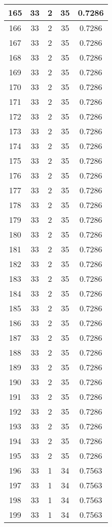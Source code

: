 \documentclass[letterpaper, 12pt]{article}
\begin{document}
\begin{longtable}{|c|c|c|c|c|}
\hline
165 & 33 & 2 & 35 & 0.7286 \\
\hline
166 & 33 & 2 & 35 & 0.7286 \\
\hline
167 & 33 & 2 & 35 & 0.7286 \\
\hline
168 & 33 & 2 & 35 & 0.7286 \\
\hline
169 & 33 & 2 & 35 & 0.7286 \\
\hline
170 & 33 & 2 & 35 & 0.7286 \\
\hline
171 & 33 & 2 & 35 & 0.7286 \\
\hline
172 & 33 & 2 & 35 & 0.7286 \\
\hline
173 & 33 & 2 & 35 & 0.7286 \\
\hline
174 & 33 & 2 & 35 & 0.7286 \\
\hline
175 & 33 & 2 & 35 & 0.7286 \\
\hline
176 & 33 & 2 & 35 & 0.7286 \\
\hline
177 & 33 & 2 & 35 & 0.7286 \\
\hline
178 & 33 & 2 & 35 & 0.7286 \\
\hline
179 & 33 & 2 & 35 & 0.7286 \\
\hline
180 & 33 & 2 & 35 & 0.7286 \\
\hline
181 & 33 & 2 & 35 & 0.7286 \\
\hline
182 & 33 & 2 & 35 & 0.7286 \\
\hline
183 & 33 & 2 & 35 & 0.7286 \\
\hline
184 & 33 & 2 & 35 & 0.7286 \\
\hline
185 & 33 & 2 & 35 & 0.7286 \\
\hline
186 & 33 & 2 & 35 & 0.7286 \\
\hline
187 & 33 & 2 & 35 & 0.7286 \\
\hline
188 & 33 & 2 & 35 & 0.7286 \\
\hline
189 & 33 & 2 & 35 & 0.7286 \\
\hline
190 & 33 & 2 & 35 & 0.7286 \\
\hline
191 & 33 & 2 & 35 & 0.7286 \\
\hline
192 & 33 & 2 & 35 & 0.7286 \\
\hline
193 & 33 & 2 & 35 & 0.7286 \\
\hline
194 & 33 & 2 & 35 & 0.7286 \\
\hline
195 & 33 & 2 & 35 & 0.7286 \\
\hline
196 & 33 & 1 & 34 & 0.7563 \\
\hline
197 & 33 & 1 & 34 & 0.7563 \\
\hline
198 & 33 & 1 & 34 & 0.7563 \\
\hline
199 & 33 & 1 & 34 & 0.7563 \\
\hline
\end{longtable}
\end{document}
